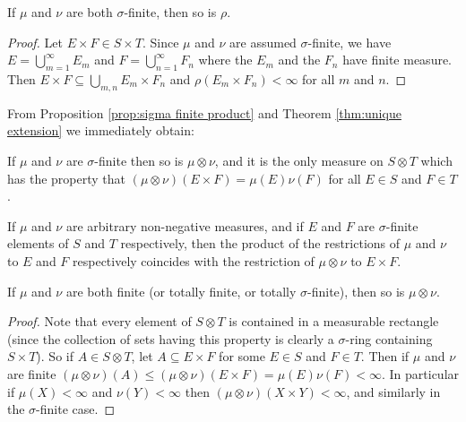 \begin{proposition}\label{prop:sigma finite product}
If $\mu$ and $\nu$ are both $\sigma$-finite, then so is $\rho$.
\end{proposition}

\begin{proof}
Let $E\times F\in S\times T$. Since $\mu$ and $\nu$ are assumed $\sigma$-finite, we have $E=\bigcup_{m=1}^\infty E_m$ and $F=\bigcup_{n=1}^\infty F_n$ where the $E_m$ and the $F_n$ have finite measure. Then $E\times F\subseteq\bigcup_{m,n}E_m\times F_n$ and $\rho(E_m\times F_n)<\infty$ for all $m$ and $n$.
\end{proof}

From Proposition \ref{prop:sigma finite product} and Theorem \ref{thm:unique extension} we immediately obtain:

\begin{proposition}
If $\mu$ and $\nu$ are $\sigma$-finite then so is $\mu\otimes\nu$, and it is the only measure on $S\otimes T$ which has the property that $(\mu\otimes\nu)(E\times F)=\mu(E)\nu(F)$ for all $E\in S$ and $F\in T$.
\end{proposition}

\begin{corollary}
If $\mu$ and $\nu$ are arbitrary non-negative measures, and if $E$ and $F$ are $\sigma$-finite elements of $S$ and $T$ respectively, then the product of the restrictions of $\mu$ and $\nu$ to $E$ and $F$ respectively coincides with the restriction of $\mu\otimes\nu$ to $E\times F$.
\end{corollary} 

\begin{proposition}\label{prop:totally finite product}
If $\mu$ and $\nu$ are both finite (or totally finite, or totally $\sigma$-finite), then so is $\mu\otimes\nu$.
\end{proposition}

\begin{proof}
Note that every element of $S\otimes T$ is contained in a measurable rectangle (since the collection of sets having this property is clearly a $\sigma$-ring containing $S\times T$). So if $A\in S\otimes T$, let $A\subseteq E\times F$ for some $E\in S$ and $F\in T$. Then if $\mu$ and $\nu$ are finite $(\mu\otimes\nu)(A)\leq(\mu\otimes\nu)(E\times F)=\mu(E)\nu(F)<\infty$. In particular if $\mu(X)<\infty$ and $\nu(Y)<\infty$ then $(\mu\otimes\nu)(X\times Y)<\infty$, and similarly in the $\sigma$-finite case.
\end{proof}

